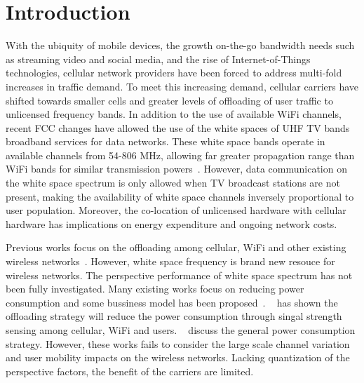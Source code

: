 \section{Introduction}
\label{sec:introduction}
With the ubiquity of mobile devices, the growth on-the-go bandwidth needs such as streaming video and social media, and the rise of Internet-of-Things technologies, cellular network providers have been forced to address multi-fold increases in traffic demand.
To meet this increasing demand, cellular carriers have shifted towards smaller cells and greater levels of offloading of user traffic to unlicensed frequency bands. In addition to the use of available WiFi channels, recent FCC changes have allowed the use of the white spaces of UHF TV bands broadband services for data networks.
These white space bands operate in available channels from 54-806 MHz, allowing far greater propagation range than WiFi bands for similar transmission powers~\cite{balanis2012antenna}.
However, data communication on the white space
spectrum is only allowed when TV broadcast stations are not present, making
the availability of white space channels inversely proportional to user population. Moreover, the co-location of unlicensed hardware with cellular hardware has implications on energy expenditure and ongoing network costs.

Previous works focus on the offloading among cellular, WiFi and other existing wireless networks~\cite{singh2013offloading}.
However, white space frequency is brand new resouce for wireless networks.
The perspective performance of white space spectrum has not been fully investigated.
Many existing works focus on reducing power consumption and some bussiness model has been proposed~\cite{aijaz2013survey}.
~\cite{han2011mobile} has shown the offloading strategy will reduce the power consumption through singal strength sensing 
among cellular, WiFi and users.
~\cite{vereecken2011power} discuss the general power consumption strategy.
However, these works fails to consider the large scale channel variation and user mobility impacts on the wireless networks.
Lacking quantization of the perspective factors, the benefit of the carriers are limited. 



